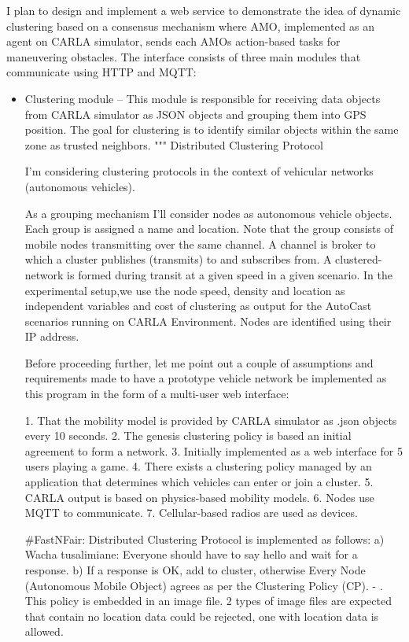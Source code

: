 \documentclass{article}
\begin{document}
I plan to design and implement a web service to demonstrate the idea of dynamic clustering based on a consensus mechanism where AMO, implemented as an agent on CARLA simulator, sends each AMOs action-based tasks for maneuvering obstacles.
The interface consists of three main modules that communicate using HTTP and MQTT:
\begin{itemize}
    \item Clustering module – This module is responsible for receiving data objects from CARLA simulator as JSON objects and grouping them into GPS position. The goal for clustering is to identify similar objects within the same zone as trusted neighbors.
    """
Distributed Clustering Protocol

I'm considering clustering protocols in the context of vehicular networks (autonomous vehicles).

As a grouping mechanism I'll consider nodes as autonomous vehicle objects. Each group is assigned a
name and location. Note that the group consists of mobile nodes transmitting over the same channel.
A channel is broker to which a cluster publishes (transmits) to and subscribes from.
A clustered-network is formed during transit at a given speed in a given scenario. In the experimental setup,we use the node
speed, density and location as independent variables and cost of clustering as output for the AutoCast scenarios running on CARLA
Environment. Nodes are identified using their IP address.

Before proceeding further, let me point out a couple of assumptions and requirements made to have a prototype vehicle network be implemented as this program in the form of a
multi-user web interface:

1. That the mobility model is provided by CARLA simulator as .json objects every 10 seconds.
2. The genesis clustering policy is based an initial agreement to form a network.
3. Initially implemented as a web interface for 5 users playing a game.
4. There exists a clustering policy managed by an application that determines which vehicles can enter or join a cluster.
5. CARLA output is based on physics-based mobility models.
6. Nodes use MQTT to communicate.
7. Cellular-based radios are used as devices.


#FastNFair: Distributed Clustering Protocol is implemented as follows:
a) Wacha tusalimiane: Everyone should have to say hello and wait for a response.
b) If a response is OK, add to cluster, otherwise
    Every Node (Autonomous Mobile Object) agrees as per the Clustering Policy (CP).
  - .
  This policy is embedded in an image file. 2 types of image files are expected that contain no location data could be
  rejected, one with location data is allowed.


\end{itemize}
\end{document}
